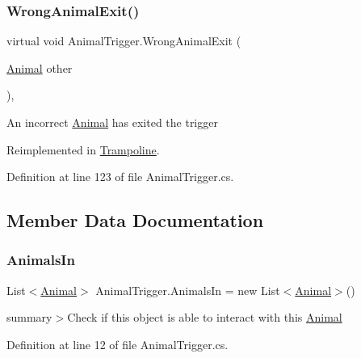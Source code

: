 \subsubsection{\texorpdfstring{Wrong\+Animal\+Exit()}{WrongAnimalExit()}}
{\footnotesize\ttfamily virtual void Animal\+Trigger.\+Wrong\+Animal\+Exit (\begin{DoxyParamCaption}\item[{\mbox{\hyperlink{class_animal}{Animal}}}]{other }\end{DoxyParamCaption})\hspace{0.3cm}{\ttfamily [protected]}, {\ttfamily [virtual]}}



An incorrect \mbox{\hyperlink{class_animal}{Animal}} has exited the trigger 



Reimplemented in \mbox{\hyperlink{class_trampoline_ac7806793d08278aafaac93d0ac552e51}{Trampoline}}.



Definition at line 123 of file Animal\+Trigger.\+cs.



\subsection{Member Data Documentation}
\mbox{\label{class_animal_trigger_acfc2fb2d9f72558027a49150e7e224ad}} 
\subsubsection{\texorpdfstring{Animals\+In}{AnimalsIn}}
{\footnotesize\ttfamily List$<$\mbox{\hyperlink{class_animal}{Animal}}$>$ Animal\+Trigger.\+Animals\+In = new List$<$\mbox{\hyperlink{class_animal}{Animal}}$>$()\hspace{0.3cm}{\ttfamily [protected]}}



summary$>$Check if this object is able to interact with this \mbox{\hyperlink{class_animal}{Animal}}



Definition at line 12 of file Animal\+Trigger.\+cs.

\mbox{\label{class_animal_trigger_ac9754af1da0271dfa7f677485953a0bb}} 
